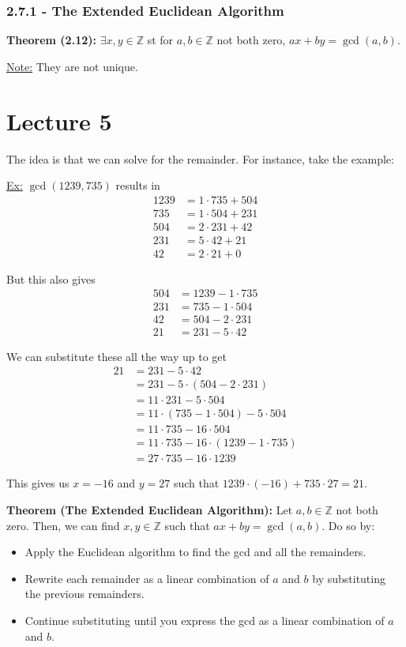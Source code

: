 \documentclass{article}
\newcommand*{\zz}{\mathbb{Z}}%
\begin{document}
\subsubsection{2.7.1 - The Extended Euclidean Algorithm}

\textbf{Theorem (2.12):} $\exists x,y\in \zz$ st for $a,b\in \zz$ not both zero, $ax+by=\gcd(a,b)$.

\underline{Note:} They are not unique. 

\section{Lecture 5}

The idea is that we can solve for the remainder. For instance, take the example:

\underline{Ex:} $\gcd(1239,735)$ results in \begin{align*}
    1239 &= 1\cdot 735 + 504 \\
    735 &= 1\cdot 504 + 231 \\
    504 &= 2\cdot 231 + 42 \\
    231 &= 5\cdot 42 + 21 \\
    42 &= 2\cdot 21 + 0
\end{align*}

But this also gives \begin{align*}
    504 &= 1239 - 1\cdot 735 \\
    231 &= 735 - 1\cdot 504 \\
    42 &= 504 - 2\cdot 231 \\
    21 &= 231 - 5\cdot 42
\end{align*}

We can substitute these all the way up to get \begin{align*}
    21 &= 231 - 5\cdot 42 \\
    &= 231 - 5\cdot (504 - 2\cdot 231) \\
    &= 11\cdot 231 - 5\cdot 504 \\
    &= 11\cdot (735 - 1\cdot 504) - 5\cdot 504 \\
    &= 11\cdot 735 - 16\cdot 504 \\
    &= 11\cdot 735 - 16\cdot (1239 - 1\cdot 735) \\
    &= 27\cdot 735 - 16\cdot 1239
\end{align*}

This gives us $x=-16$ and $y=27$ such that $1239\cdot (-16) + 735\cdot 27 = 21$.

\textbf{Theorem (The Extended Euclidean Algorithm):} Let $a,b\in \zz$ not both zero. Then, we can find $x,y\in \zz$ such that $ax+by=\gcd(a,b)$. Do so by: \begin{itemize}
    \item Apply the Euclidean algorithm to find the gcd and all the remainders.
    \item Rewrite each remainder as a linear combination of $a$ and $b$ by substituting the previous remainders.
    \item Continue substituting until you express the gcd as a linear combination of $a$ and $b$.
\end{itemize}
\end{document}
